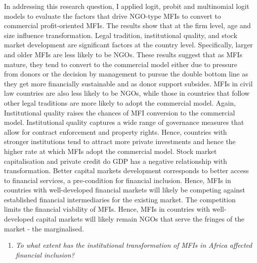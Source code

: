 \documentclass[a4paper, nobind]{templates/ociamthesis}
\providecommand{\tightlist}{%
  \setlength{\itemsep}{0pt}\setlength{\parskip}{0pt}}
\begin{document}
In addressing this research question, I applied logit, probit and multinomial logit models to evaluate the factors that drive NGO-type MFIs to convert to commercial profit-oriented MFIs. The results show that at the firm level, age and size influence transformation. Legal tradition, institutional quality, and stock market development are significant factors at the country level. Specifically, larger and older MFIs are less likely to be NGOs. These results suggest that as MFIs mature, they tend to convert to the commercial model either due to pressure from donors or the decision by management to pursue the double bottom line as they get more financially sustainable and as donor support subsides. MFIs in civil law countries are also less likely to be NGOs, while those in countries that follow other legal traditions are more likely to adopt the commercial model. Again, Institutional quality raises the chances of MFI conversion to the commercial model. Institutional quality captures a wide range of governance measures that allow for contract enforcement and property rights. Hence, countries with stronger institutions tend to attract more private investments and hence the higher rate at which MFIs adopt the commercial model. Stock market capitalisation and private credit do GDP has a negative relationship with transformation. Better capital markets development corresponds to better access to financial services, a pre-condition for financial inclusion. Hence, MFIs in countries with well-developed financial markets will likely be competing against established financial intermediaries for the existing market. The competition limits the financial viability of MFIs. Hence, MFIs in countries with well-developed capital markets will likely remain NGOs that serve the fringes of the market - the marginalised.

\begin{enumerate}
\def\labelenumi{\arabic{enumi}.}
\setcounter{enumi}{1}
\tightlist
\item
  \emph{To what extent has the institutional transformation of MFIs in Africa affected financial inclusion?}
\end{enumerate}
\end{document}
